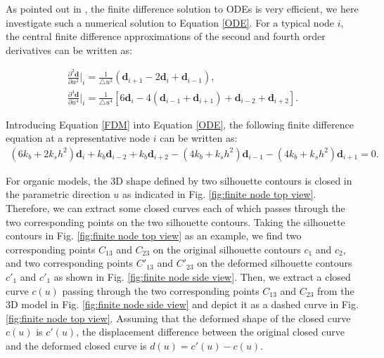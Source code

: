 \documentclass[runningheads]{llncs}
\begin{document}
As pointed out in \cite{chaudhry2013shape}, the finite difference solution to ODEs is very efficient, we here investigate such a numerical solution to Equation \eqref{ODE}. For a typical node $i$, the central finite difference approximations of the second and fourth order derivatives can be written as:

\begin{equation}
\begin{split}
    \frac{\partial^2\mathbf{d}}{\partial u^2}|_i =\frac{1}{\triangle u^2}(\mathbf{d}_{i+1}-2\mathbf{d}_i+\mathbf{d}_{i-1}), \\
    \frac{\partial^4\mathbf{d}}{\partial u^4}|_i =\frac{1}{\triangle u^4}[6\mathbf{d}_i-4(\mathbf{d}_{i-1}+\mathbf{d}_{i+1})+\mathbf{d}_{i-2}+\mathbf{d}_{i+2}].
\label{FDM}
\end{split}    
\end{equation}

Introducing Equation \eqref{FDM} into Equation \eqref{ODE}, the following finite difference equation at a representative node $i$ can be written as:
\begin{equation}
    \begin{split}
    (6k_b+2k_sh^2)\mathbf{d}_i+k_b\mathbf{d}_{i-2}+k_b\mathbf{d}_{i+2}-(4k_b+k_sh^2)\mathbf{d}_{i-1}-(4k_b+k_sh^2)\mathbf{d}_{i+1}=0.
    \label{odefdm}
    \end{split}    
\end{equation}

For organic models, the 3D shape defined by two silhouette contours is closed in the parametric direction $u$ as indicated in Fig. \ref{fig:finite node top view}. Therefore, we can extract some closed curves each of which passes through the two corresponding points on the two silhouette contours. Taking the silhouette contours in Fig. \ref{fig:finite node top view} as an example, we find two corresponding points $C_{13}$ and $C_{23}$ on the original silhouette contours $c_{1}$ and $c_{2}$, and two corresponding points $C'_{13}$  and $C'_{23}$ on the deformed silhouette contours $c'_{1}$ and $c'_{1}$ as shown in Fig. \ref{fig:finite node side view}. Then, we extract a closed curve $c(u)$ passing  through the two corresponding  points $C_{13}$  and $C_{23}$ from the 3D model in Fig. \ref{fig:finite node side view} and depict it as a dashed curve in Fig. \ref{fig:finite node top view}. Assuming that the deformed shape of the closed curve $c(u)$ is $c'(u)$, the displacement difference between the original closed curve and the deformed closed curve is $d(u) = c'(u)-c(u)$.
\end{document}
